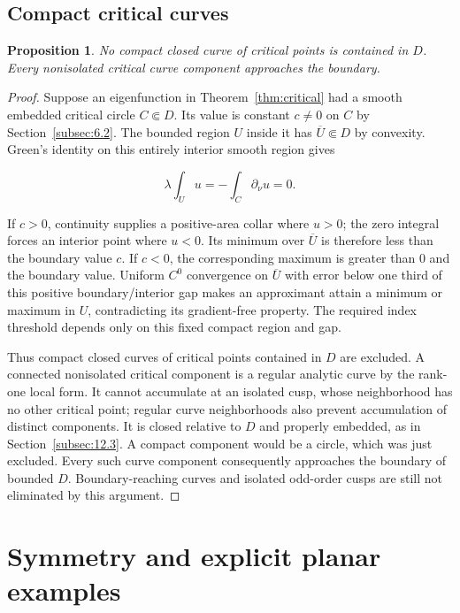 \documentclass[11pt]{article}
\newtheorem{proposition}[theorem]{Proposition}
\theoremstyle{definition}
\theoremstyle{remark}
\numberwithin{equation}{section}
\begin{document}
\subsection{Compact critical curves}\label{subsec:6.4}
\begin{proposition}\label{prop:compact-critical}
No compact closed curve of critical points is contained in $D$. Every nonisolated critical curve component approaches the boundary.
\end{proposition}
\begin{proof}

Suppose an eigenfunction in Theorem~\ref{thm:critical} had a smooth embedded critical circle $C\Subset D$. Its value is constant $c\ne0$ on $C$ by Section~\ref{subsec:6.2}. The bounded region $U$ inside it has $\overline U\Subset D$ by convexity. Green's identity on this entirely interior smooth region gives

\begin{equation}\label{eq:src-6-04}
\lambda\int_Uu=-\int_C\partial_\nu u=0.
\end{equation}

If $c>0$, continuity supplies a positive-area collar where $u>0$; the zero integral forces an interior point where $u<0$. Its minimum over $\overline U$ is therefore less than the boundary value $c$. If $c<0$, the corresponding maximum is greater than 0 and the boundary value. Uniform $C^0$ convergence on $\overline U$ with error below one third of this positive boundary/interior gap makes an approximant attain a minimum or maximum in $U$, contradicting its gradient-free property. The required index threshold depends only on this fixed compact region and gap.

Thus compact closed curves of critical points contained in $D$ are excluded. A connected nonisolated critical component is a regular analytic curve by the rank-one local form. It cannot accumulate at an isolated cusp, whose neighborhood has no other critical point; regular curve neighborhoods also prevent accumulation of distinct components. It is closed relative to $D$ and properly embedded, as in Section~\ref{subsec:12.3}. A compact component would be a circle, which was just excluded. Every such curve component consequently approaches the boundary of bounded $D$. Boundary-reaching curves and isolated odd-order cusps are still not eliminated by this argument.
\end{proof}


\section{Symmetry and explicit planar examples}\label{sec:symmetry}
\end{document}
